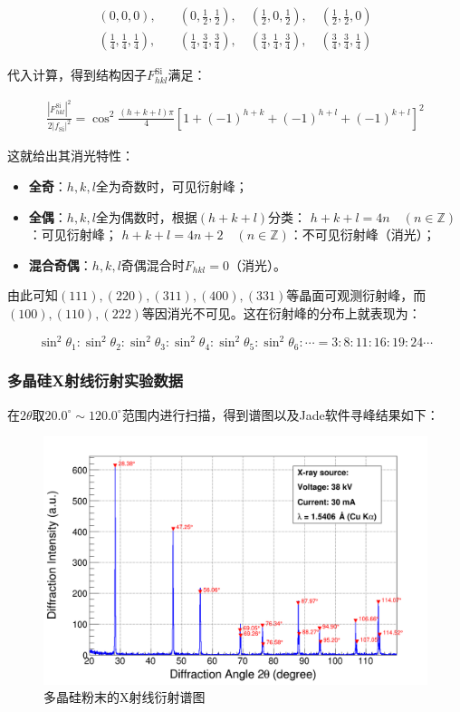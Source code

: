 \documentclass{thuemp}
\begin{document}
\begin{align*}
(0,0,0),\quad &(0,\frac{1}{2},\frac{1}{2}),\quad (\frac{1}{2},0,\frac{1}{2}),\quad (\frac{1}{2},\frac{1}{2},0) \\
(\frac{1}{4},\frac{1}{4},\frac{1}{4}),\quad &(\frac{1}{4},\frac{3}{4},\frac{3}{4}),\quad (\frac{3}{4},\frac{1}{4},\frac{3}{4}),\quad (\frac{3}{4},\frac{3}{4},\frac{1}{4})
\end{align*}

代入计算，得到结构因子$F_{hkl}^{\text{Si}}$满足：

\begin{eqnarray}
    \frac{|F_{hkl}^{\text{Si}}|^2}{2|f_{\text{Si}}|^2} =\cos^2 \frac{(h+k+l)\pi}{4} \left[1 + (-1)^{h+k} + (-1)^{h+l} + (-1)^{k+l}\right]^2
    \label{eq:si_struct_fac}
\end{eqnarray}

这就给出其消光特性：

\begin{itemize}
    \item \textbf{全奇}：$h,k,l$全为奇数时，可见衍射峰；
    \item \textbf{全偶}：$h,k,l$全为偶数时，根据$(h+k+l)$分类：
        \subitem $h+k+l = 4n \quad(n\in\mathbb{Z})$：可见衍射峰；
        \subitem $h+k+l = 4n+2 \quad(n\in\mathbb{Z})$：不可见衍射峰（消光）；
    \item \textbf{混合奇偶}：$h,k,l$奇偶混合时$F_{hkl}=0$（消光）。
\end{itemize}

由此可知$(111), (220), (311), (400), (331)$等晶面可观测衍射峰，而$(100), (110), (222)$等因消光不可见。这在衍射峰的分布上就表现为：

\begin{equation}
    \sin^2\theta_1 : \sin^2\theta_2: \sin^2\theta_3 : \sin^2\theta_4 : \sin^2\theta_5 : \sin^2\theta_6 : \cdots =
    3 : 8 : 11 : 16: 19: 24 \cdots
    \label{eq:si_diff_patt}
\end{equation}

\subsubsection{多晶硅X射线衍射实验数据}

在$2\theta$取$20.0^\circ \sim 120.0^\circ$范围内进行扫描，得到谱图以及Jade软件寻峰结果如下：

\begin{figure}[H]
    \centering
    \includegraphics[width=0.8\linewidth]{../Data/Silicon-multi.png}
    \caption{多晶硅粉末的X射线衍射谱图}
    \label{fig:si_xrd}    
\end{figure}
\end{document}
